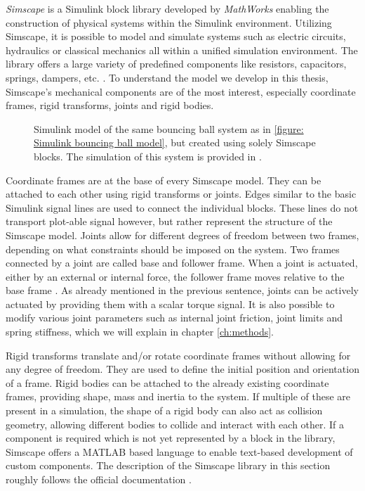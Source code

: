 \textit{Simscape\textsuperscript{\texttrademark}} is a Simulink block library developed by \textit{MathWorks\textsuperscript{\textregistered}} enabling the construction of physical systems within the Simulink environment.
Utilizing Simscape, it is possible to model and simulate systems such as electric circuits, hydraulics or classical mechanics all within a unified simulation environment.
The library offers a large variety of predefined components like resistors, capacitors, springs, dampers, etc. \parencite{matlabSimscapeDocumentation}.
To understand the model we develop in this thesis, Simscape's mechanical components are of the most interest, especially coordinate frames, rigid transforms, joints and rigid bodies.

\begin{figure}[h!]
	\centering
	\centerline{}
	\caption[Simscape bouncing ball example]{Simulink model of the same bouncing ball system as in \ref{figure: Simulink bouncing ball model}, but created using solely Simscape blocks. The simulation of this system is provided in \cite{VIDEO 1}. }
	\label{figure: Simscape Bouncing Ball Example}
\end{figure}

Coordinate frames are at the base of every Simscape model.
They can be attached to each other using rigid transforms or joints.
Edges similar to the basic Simulink signal lines are used to connect the individual blocks.
These lines do not transport plot-able signal however, but rather represent the structure of the Simscape model.
Joints allow for different degrees of freedom between two frames, depending on what constraints should be imposed on the system.
Two frames connected by a joint are called base and follower frame.
When a joint is actuated, either by an external or internal force, the follower frame moves relative to the base frame \parencite{thilderkvist2015motion}.
As already mentioned in the previous sentence, joints can be actively actuated by providing them with a scalar torque signal.
It is also possible to modify various joint parameters such as internal joint friction, joint limits and spring stiffness, which we will explain in chapter \ref{ch:methods}.

Rigid transforms translate and/or rotate coordinate frames without allowing for any degree of freedom.
They are used to define the initial position and orientation of a frame.
Rigid bodies can be attached to the already existing coordinate frames, providing shape, mass and inertia to the system.
If multiple of these are present in a simulation, the shape of a rigid body can also act as collision geometry, allowing different bodies to collide and interact with each other.
If a component is required which is not yet represented by a block in the library, Simscape offers a MATLAB based language to enable text-based development of custom components.
The description of the Simscape library in this section roughly follows the official documentation \parencite{matlabSimscapeDocumentation}.

